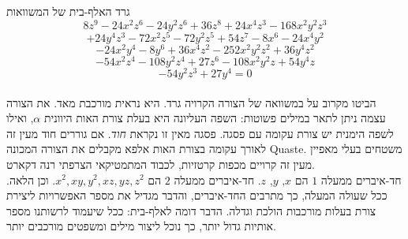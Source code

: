 \begin{surferPage}{גרד}
האלף-בית של המשוואות
  \smallskip
\[8z^9-24x^2z^6-24y^2z^6+36z^8+24x^4z^3-168x^2y^2z^3\]
\[+24y^4z^3-72x^2z^5-72y^2z^5+54z^7-8x^6-24x^4y^2\]
\[-24x^2y^4-8y^6 + 36x^4z^2-252x^2y^2z^2+36y^4z^2\]
\[- 54x^2z^4-108y^2z^4 + 27z^6-108x^2y^2z + 54y^4z\]
\[-54y^2z^3 + 27y^4 = 0\]\\
\vspace{0,3cm}
הביטו מקרוב על במשוואה של הצורה הקרויה גרד. היא נראית מורכבת מאד.
את הצורה עצמה ניתן לתאר במילים פשוטות: השפה העליונה היא בעלת צורת האות היוונית $\alpha$, ואילו לשפה הימנית יש צורת עקומה עם פסגה. פסגה מאין זו נקראת {\it חוד}. אם גוררים חוד מעין זה לאורך עקומה בצורת האות אלפא מקבלים את הצורה המכונה Quaste. משטחים בעלי מאפיין מעין זה קרויים מכפות קרטזיות, לכבוד המתמטיקאי הצרפתי רנה דקארט.\\
\vspace{0,3cm}
חד-איברים ממעלה $1$ הם $x$, $y$, $z$. חד-איברים ממעלה $2$ הם $x^2, xy, y^2, xz, yz, z^2$. וכן הלאה. ככל שעולה המעלה, כך מתרבים החד-איברים, והדבר מגדיל את מספר האפשרויות ליצירת צורת בעלות מורכבות הולכת וגדלה. הדבר דומה לאלף-בית: ככל שיעמוד לרשותנו מספר אותיות גדול יותר, כך נוכל ליצור מילים ומשפטים מורכבים יותר.
\end{surferPage}
